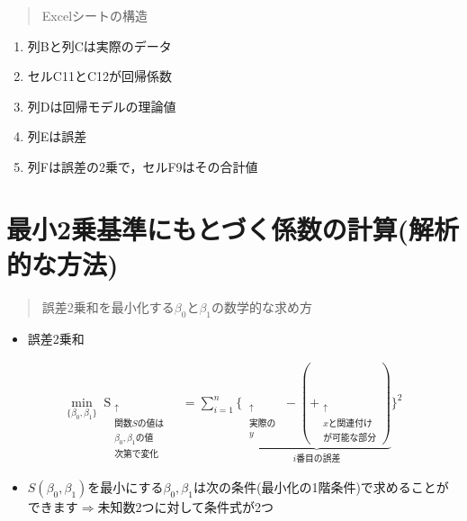 \documentclass[
]{book}
\providecommand{\tightlist}{%
  \setlength{\itemsep}{0pt}\setlength{\parskip}{0pt}}
\theoremstyle{definition}
\theoremstyle{definition}
\theoremstyle{definition}
\theoremstyle{definition}
\theoremstyle{remark}
\begin{document}
\begin{quote}
Excelシートの構造
\end{quote}

\begin{enumerate}
\def\labelenumi{\arabic{enumi}.}
\item
  列Bと列Cは実際のデータ
\item
  セルC11とC12が回帰係数
\item
  列Dは回帰モデルの理論値
\item
  列Eは誤差
\item
  列Fは誤差の2乗で，セルF9はその合計値
\end{enumerate}

\hypertarget{ux6700ux5c0f2ux4e57ux57faux6e96ux306bux3082ux3068ux3065ux304fux4fc2ux6570ux306eux8a08ux7b97ux89e3ux6790ux7684ux306aux65b9ux6cd5}{%
\section{最小2乗基準にもとづく係数の計算(解析的な方法)}\label{ux6700ux5c0f2ux4e57ux57faux6e96ux306bux3082ux3068ux3065ux304fux4fc2ux6570ux306eux8a08ux7b97ux89e3ux6790ux7684ux306aux65b9ux6cd5}}

\begin{quote}
誤差2乗和を最小化する\(\beta_0\)と\(\beta_1\)の数学的な求め方
\end{quote}

\begin{itemize}
\tightlist
\item
  誤差2乗和
\end{itemize}

\begin{align*}
\mathop{\min}_{\{\beta_0,\beta_1\}} 
\mathop{S(\beta_0,\beta_1)}_{\substack{\uparrow \\ \text{関数}S\text{の値は} \\ \beta_0,\beta_1\text{の値} \\ \text{次第で変化}}}
&=\sum_{i=1}^n \{ 
\underbrace{
\mathop{y_i}_{\substack{\uparrow \\ \text{実際の} \\ y}}
-(\mathop{\beta_0+\beta_1 x_i}_{\substack{\uparrow \\ x\text{と関連付け} \\ \text{が可能な部分}}}) 
}_{i\text{番目の誤差}}
\}^2 
\end{align*}

\begin{itemize}
\tightlist
\item
  \(S(\beta_0,\beta_1)\)を最小にする\(\beta_0,\beta_1\)は次の条件(最小化の1階条件)で求めることができます\(\Rightarrow\)未知数2つに対して条件式が2つ
\end{itemize}
\end{document}

